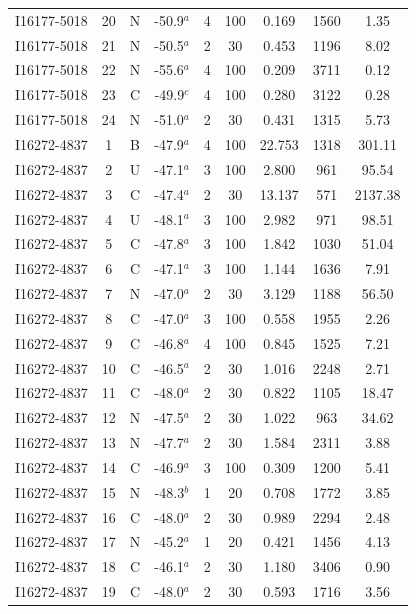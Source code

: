 \begin{table}
\begin{tabular}{ccccccccc}
I16177-5018 & 20 & N & -50.9$^{a}$ & 4 & 100 & 0.169 & 1560 & 1.35 \\
I16177-5018 & 21 & N & -50.5$^{a}$ & 2 & 30 & 0.453 & 1196 & 8.02 \\
I16177-5018 & 22 & N & -55.6$^{a}$ & 4 & 100 & 0.209 & 3711 & 0.12 \\
I16177-5018 & 23 & C & -49.9$^{c}$ & 4 & 100 & 0.280 & 3122 & 0.28 \\
I16177-5018 & 24 & N & -51.0$^{a}$ & 2 & 30 & 0.431 & 1315 & 5.73 \\
I16272-4837 & 1 & B & -47.9$^{a}$ & 4 & 100 & 22.753 & 1318 & 301.11 \\
I16272-4837 & 2 & U & -47.1$^{a}$ & 3 & 100 & 2.800 & 961 & 95.54 \\
I16272-4837 & 3 & C & -47.4$^{a}$ & 2 & 30 & 13.137 & 571 & 2137.38 \\
I16272-4837 & 4 & U & -48.1$^{a}$ & 3 & 100 & 2.982 & 971 & 98.51 \\
I16272-4837 & 5 & C & -47.8$^{a}$ & 3 & 100 & 1.842 & 1030 & 51.04 \\
I16272-4837 & 6 & C & -47.1$^{a}$ & 3 & 100 & 1.144 & 1636 & 7.91 \\
I16272-4837 & 7 & N & -47.0$^{a}$ & 2 & 30 & 3.129 & 1188 & 56.50 \\
I16272-4837 & 8 & C & -47.0$^{a}$ & 3 & 100 & 0.558 & 1955 & 2.26 \\
I16272-4837 & 9 & C & -46.8$^{a}$ & 4 & 100 & 0.845 & 1525 & 7.21 \\
I16272-4837 & 10 & C & -46.5$^{a}$ & 2 & 30 & 1.016 & 2248 & 2.71 \\
I16272-4837 & 11 & C & -48.0$^{a}$ & 2 & 30 & 0.822 & 1105 & 18.47 \\
I16272-4837 & 12 & N & -47.5$^{a}$ & 2 & 30 & 1.022 & 963 & 34.62 \\
I16272-4837 & 13 & N & -47.7$^{a}$ & 2 & 30 & 1.584 & 2311 & 3.88 \\
I16272-4837 & 14 & C & -46.9$^{a}$ & 3 & 100 & 0.309 & 1200 & 5.41 \\
I16272-4837 & 15 & N & -48.3$^{b}$ & 1 & 20 & 0.708 & 1772 & 3.85 \\
I16272-4837 & 16 & C & -48.0$^{a}$ & 2 & 30 & 0.989 & 2294 & 2.48 \\
I16272-4837 & 17 & N & -45.2$^{a}$ & 1 & 20 & 0.421 & 1456 & 4.13 \\
I16272-4837 & 18 & C & -46.1$^{a}$ & 2 & 30 & 1.180 & 3406 & 0.90 \\
I16272-4837 & 19 & C & -48.0$^{a}$ & 2 & 30 & 0.593 & 1716 & 3.56 \\

\end{tabular}
\end{table}
